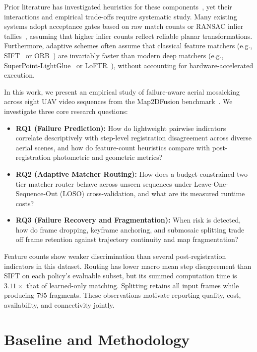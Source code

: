 \documentclass[conference]{IEEEtran}
\begin{document}
Prior literature has investigated heuristics for these components~\cite{hwang2026,li2023,kharismawati2025}, yet their interactions and empirical trade-offs require systematic study. Many existing systems adopt acceptance gates based on raw match counts or RANSAC inlier tallies~\cite{hwang2026}, assuming that higher inlier counts reflect reliable planar transformations. Furthermore, adaptive schemes often assume that classical feature matchers (e.g., SIFT~\cite{lowe2004} or ORB~\cite{rublee2011}) are invariably faster than modern deep matchers (e.g., SuperPoint-LightGlue~\cite{detone2018,lindenberger2023} or LoFTR~\cite{sun2021}), without accounting for hardware-accelerated execution.

In this work, we present an empirical study of failure-aware aerial mosaicking across eight UAV video sequences from the Map2DFusion benchmark~\cite{map2dfusion}. We investigate three core research questions:
\begin{itemize}
    \item \textbf{RQ1 (Failure Prediction):} How do lightweight pairwise indicators correlate descriptively with step-level registration disagreement across diverse aerial scenes, and how do feature-count heuristics compare with post-registration photometric and geometric metrics?
    \item \textbf{RQ2 (Adaptive Matcher Routing):} How does a budget-constrained two-tier matcher router behave across unseen sequences under Leave-One-Sequence-Out (LOSO) cross-validation, and what are its measured runtime costs?
    \item \textbf{RQ3 (Failure Recovery and Fragmentation):} When risk is detected, how do frame dropping, keyframe anchoring, and submosaic splitting trade off frame retention against trajectory continuity and map fragmentation?
\end{itemize}

Feature counts show weaker discrimination than several post-registration indicators in this dataset. Routing has lower macro mean step disagreement than SIFT on each policy's evaluable subset, but its summed computation time is $3.11\times$ that of learned-only matching. Splitting retains all input frames while producing 795 fragments. These observations motivate reporting quality, cost, availability, and connectivity jointly.



\section{Baseline and Methodology}
\label{sec:methodology}
\end{document}
